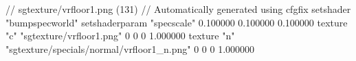 // sgtexture/vrfloor1.png (131)
// Automatically generated using cfgfix
setshader "bumpspecworld"
setshaderparam "specscale" 0.100000 0.100000 0.100000
texture "c" "sgtexture/vrfloor1.png" 0 0 0 1.000000
texture "n" "sgtexture/specials/normal/vrfloor1_n.png" 0 0 0 1.000000
